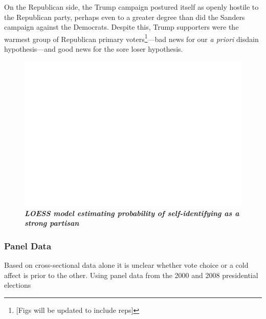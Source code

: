 \documentclass[12pt]{paper}
\begin{document}
On the Republican side, the Trump campaign postured itself as openly hostile to the Republican party, perhaps even to a greater degree than did the Sanders campaign against the Democrats. Despite this, Trump supporters were the warmest group of Republican primary voters\footnote{[Figs will be updated to include reps]}---bad news for our \textit{a priori} disdain hypothesis---and good news for the sore loser hypothesis.

\begin{figure}
\centering
\includegraphics[width=1\textwidth]{partisan-loess-all.png}
\caption{\label{fig:loess} \textit{\textbf{LOESS model estimating probability of self-identifying as a strong partisan}}}
\end{figure}

\subsubsection{Panel Data}

Based on cross-sectional data alone it is unclear whether vote choice or a cold affect is prior to the other. Using panel data from the 2000 and 2008 presidential elections


\end{document}
